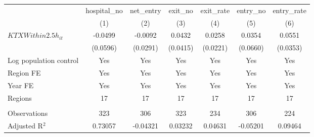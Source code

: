 \begingroup
\centering
\begin{tabular}{lcccccc}
   \toprule
                          & hospital\_no  & net\_entry  & exit\_no  & exit\_rate  & entry\_no  & entry\_rate \\    
                          & (1)           & (2)         & (3)       & (4)         & (5)        & (6)\\  
   \midrule 
   $KTXWithin2.5h_{it}$   & -0.0499       & -0.0092     & 0.0432    & 0.0258      & 0.0354     & 0.0551\\   
                          & (0.0596)      & (0.0291)    & (0.0415)  & (0.0221)    & (0.0660)   & (0.0353)\\   
   Log population control & Yes           & Yes         & Yes       & Yes         & Yes        & Yes\\  
   Region FE              & Yes           & Yes         & Yes       & Yes         & Yes        & Yes\\  
   Year FE                & Yes           & Yes         & Yes       & Yes         & Yes        & Yes\\  
   Regions                & 17            & 17          & 17        & 17          & 17         & 17\\  
    \\
   Observations           & 323           & 306         & 323       & 234         & 306        & 224\\  
   Adjusted R$^2$         & 0.73057       & -0.04321    & 0.03232   & 0.04631     & -0.05201   & 0.09464\\  
   \bottomrule
\end{tabular}
\par\endgroup
